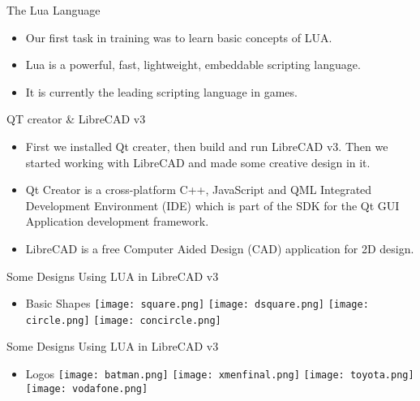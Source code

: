 
\begin{frame}[t,plain]
\titlepage
\end{frame}

\begin{frame}[t]{The Lua Language}
\begin{itemize}
\item<1-> Our first task in training was to learn basic concepts of LUA. 
\item<2-> Lua is a powerful, fast, lightweight, embeddable scripting language.
\item<3-> It is currently the leading scripting language in games.
\end{itemize}
\end{frame}

\begin{frame}[t]{QT creator \& LibreCAD v3}
\begin{itemize}
\item<1-> First we installed Qt creater, then build and run LibreCAD v3. Then we started working with LibreCAD and made some creative design in it.
\item<2-> Qt Creator is a cross-platform C++, JavaScript and QML Integrated Development Environment (IDE) which is part of the SDK for the Qt GUI Application development framework.
\item<3-> LibreCAD is a free Computer Aided Design (CAD) application for 2D design.
\end{itemize}
\end{frame}

\watermarkoff
\begin{frame}[t,fragile]{Some Designs Using LUA in LibreCAD v3}
\begin{itemize}
\item Basic Shapes
\texttt{[image: square.png]}
\hspace*{1\baselineskip}
\texttt{[image: dsquare.png]}
\vspace*{1\baselineskip}
\texttt{[image: circle.png]}
\hspace*{1\baselineskip}
\texttt{[image: concircle.png]} 
\end{itemize}
\end{frame}

\begin{frame}[t,fragile]{Some Designs Using LUA in LibreCAD v3}
\begin{itemize}
\item Logos
\texttt{[image: batman.png]}
\hspace*{1\baselineskip}
\texttt{[image: xmenfinal.png]}
\vspace*{1\baselineskip}
\texttt{[image: toyota.png]}
\hspace*{1\baselineskip}
\texttt{[image: vodafone.png]}

\end{itemize}
\end{frame}

